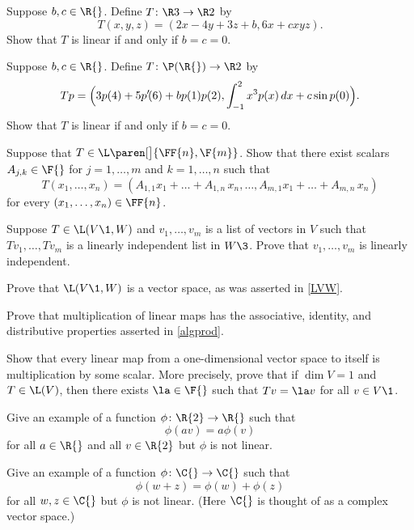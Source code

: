 
\exercise
Suppose $b, c \in \R{}$. Define $T \colon \R3 \to \R2$ by
\[
T(x, y, z) = (2x -4y + 3z + b, 6x + c xyz).
\]
Show that $T$ is linear if and only if $b = c = 0$.


\exercise
Suppose $b, c \in \R{}$. Define $T \colon \P(\R{}) \to \R2$ by
\[
Tp = \Bigl(3p(4) + 5p' \! (6) + b p(1) p(2), \int_{-1}^2 x^3 p(x)\, dx + c \sin p(0)\Bigr).
\]
Show that $T$ is linear if and only if $b = c = 0$.


\exercise
Suppose that $T \in \L\paren[\big]{\FF{n}, \F{m}}$.  Show that there exist scalars $A_{j, k} \in \F{}$ for $j = 1, \dots, m$ and $k = 1, \dots, n$ such that
\[
T(x_1, \dots, x_n) =
(A_{1,1}x_1 + \dots + A_{1,n}\,x_n, \dots, A_{m,1}x_1 + \dots + A_{m,n}\,x_n)
\]
for every $(x_1, \dots, x_n) \in \FF{n}$.


\exercise
Suppose $T \in \L(V\1, W)$ and $v_1, \dots, v_m$ is a list of vectors in $V$ such that
$Tv_1, \dots, Tv_m$ is a linearly independent list in $W\3$. Prove that $v_1, \dots, v_m$ is linearly independent.


\exercise
Prove that $\L(V\1,W)$ is a vector space, as was asserted in \ref{LVW}.


\exercise
Prove that multiplication of linear maps has the associative, identity, and distributive properties asserted in \ref{algprod}.


\exercise
Show that every linear map from a one-dimensional vector space to
itself is multiplication by some scalar.  More precisely, prove that
if $\dim V = 1$ and $T \in \L(V)$, then there exists $\la \in \F{}$ such
that $Tv = \la v$ for all $v \in V\1$. \label{dualone}


\exercise
Give an example of a function $\phi\colon \R{2} \to \R{}$ such that \label{403}
\[
\phi(av) = a \phi(v)
\]
for all $a \in \R{}$ and all $v \in \R{2}$ but $\phi$ is not linear.


\exercise
Give an example of a function $\phi \colon \C{} \to \C{}$ such that
\[
\phi(w + z) = \phi(w) + \phi(z)
\]
for all $w, z \in \C{}$ but $\phi$ is not linear. (Here $\C{}$ is thought of as a complex vector space.)

